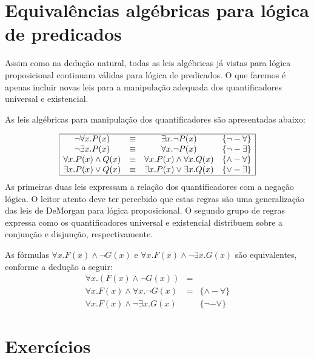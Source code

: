 \section{Equivalências algébricas para lógica de predicados}

Assim como na dedução natural, todas as leis algébricas já vistas para
lógica proposicional continuam válidas para lógica de predicados. O
que faremos é apenas incluir novas leis para a manipulação adequada
dos quantificadores universal e existencial.

As leis algébricas para manipulação dos quantificadores são
apresentadas abaixo:

\[
\begin{array}{|cccl|}
\hline
\neg \forall x. P(x) & \equiv & \exists x. \neg P(x) &
\{\neg-\forall\}\\
\neg \exists x. P(x) & \equiv & \forall x. \neg P(x) &
\{\neg-\exists\}\\
\forall x. P(x) \land Q(x) & \equiv & \forall x. P(x) \land \forall
x. Q(x) & \{\land-\forall\} \\
\exists x. P(x) \lor Q(x) & \equiv & \exists x. P(x) \lor \exists
x. Q(x) & \{\lor-\exists\} \\ \hline
\end{array}
\]
As primeiras duas leis expressam a relação dos quantificadores com a
negação lógica. O leitor atento deve ter percebido que estas regras
são uma generalização das leis de DeMorgan para lógica proposicional.
O segundo grupo de regras expressa como os quantificadores universal e
existencial distribuem sobre a conjunção e disjunção, respectivamente.

\begin{Example}
As fórmulas $\forall x. F(x) \land \neg G(x)$ e $\forall x. F(x) \land
\neg \exists x. G(x)$ são equivalentes, conforme a dedução a seguir:
\[
      \begin{array}{lcl}
          \forall x.(F(x)\land\neg G(x)) & = & \\
	 \forall x.F(x)\land\forall x.\neg G(x) & = &\{\land-\forall\}\\
         \forall x.F(x)\land\neg\exists x.G(x) &  & \{\neg-\forall\}
      \end{array}
\]
\end{Example}

\section{Exercícios}

